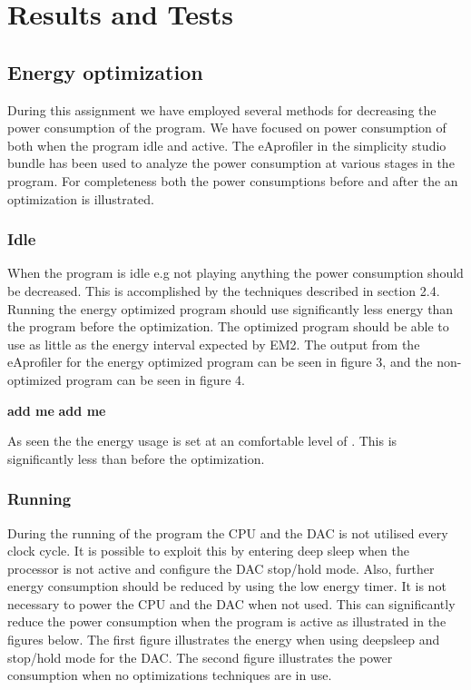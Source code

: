 \section{Results and Tests}

\subsection{Energy optimization}
During this assignment we have employed several methods for decreasing the power consumption of the program. We have focused on power consumption of both when the program idle and active. The eAprofiler in the simplicity studio bundle has been used to analyze the power consumption at various stages in the program. For completeness both the power consumptions before and after the an optimization is illustrated.


\subsubsection{Idle}
When the program is idle e.g not playing anything the power consumption should be decreased. This is accomplished by the techniques described in section 2.4. Running the energy optimized program should use significantly less energy than the program before the optimization. The optimized program should be able to use as little as the energy interval expected by EM2. The output from the eAprofiler for the energy optimized program can be seen in figure 3, and the non-optimized program can be seen in figure 4.



{\bf add me}
{\bf add me}

As seen the the energy usage is set at an comfortable level of  . This is significantly less than before the optimization. 




\subsubsection{Running}
During the running of the program the CPU and the DAC is not utilised every clock cycle. It is possible to exploit this by entering deep sleep when the processor is not active and configure the DAC stop/hold mode. Also, further energy consumption should be reduced by using the low energy timer. It is not necessary to power the CPU and the DAC when not used. This can significantly reduce the power consumption when the program is active as illustrated in the figures below. The first figure illustrates the energy when using deepsleep and stop/hold mode for the DAC. The second figure illustrates the power consumption when no optimizations techniques are in use.

